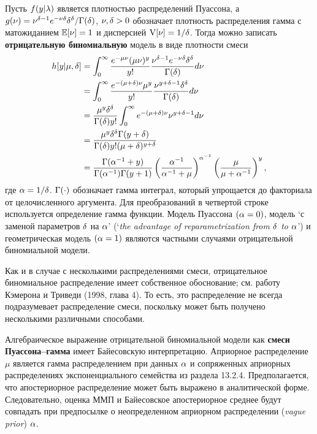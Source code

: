 Пусть $f(y|\lambda)$ является плотностью распределений Пуассона, а $g(\nu) = \nu^{\delta - 1}e^{-\nu\delta}\delta^\delta / \Gamma(\delta)$, $\nu, \delta > 0$ обозначает плотность распределения гамма с матожиданием $\mathbb{E}[\nu] = 1$ и дисперсией $\mathrm{V}[\nu] = 1/\delta$. Тогда можно записать \textbf{отрицательную биномиальную} модель в виде плотности смеси %
    \begin{align}\label{eq:20.12}
    h[y|\mu, \delta]   &= \int^{\infty}_{0} \frac{e^{-\mu\nu}(\mu\nu)^y}{y!} \frac{\nu^{\delta - 1}e^{-\nu\delta}\delta^\delta}{\Gamma(\delta)} d\nu \\
                    &= \int^{\infty}_{0} \frac{e^{-(\mu + \delta)\nu} \mu^y}{y!} \frac{\nu^{y + \delta - 1} \delta^\delta}{\Gamma(\delta)} d\nu \notag \\
                    &= \frac{\mu^y \delta^\delta}{\Gamma(\delta) y!} \int^{\infty}_{0} e^{-(\mu + \delta)\nu} \nu^{y + \delta - 1} d\nu \notag \\
                    &= \frac{\mu^y \delta^\delta \Gamma(y + \delta)}{\Gamma(\delta) y! (\mu + \delta)^{y + \delta}} \notag \\
                    &= \frac{\Gamma(\alpha^{-1} + y)}{\Gamma(\alpha^{-1}) \Gamma(y + 1)} \left( \frac{\alpha^{-1}}{\alpha^{-1} +\mu } \right)^{\alpha^{-1}} \left( \frac{\mu}{\mu + \alpha^{-1}} \right)^{y}, \notag
    \end{align}
где $\alpha = 1/\delta$. $\Gamma(\cdot)$ обозначает гамма интеграл, который упрощается до факториала от целочисленного аргумента. Для преобразований в четвертой строке используется определение гамма функции. Модель Пуассона $(\alpha = 0)$, модель `с заменой параметров $\delta$ на $\alpha$' (`\textit{the advantage of reparametrization from $\delta$ to $\alpha$}') и геометрическая модель $(\alpha = 1)$ являются частными случаями отрицательной биномиальной модели.

Как и в случае с несколькими распределениями смеси, отрицательное биномиальное распределение имеет собственное обоснование; см. работу Кэмерона и Триведи (1998, глава 4). То есть, это распределение не всегда подразумевает распределение смеси, поскольку может быть получено несколькими различными способами.

Алгебраическое выражение отрицательной биномиальной модели как \textbf{смеси Пуассона--гамма} имеет Байесовскую интерпретацию. Априорное распределение $\mu$ является гамма распределением при данных $\alpha$ и сопряженных априорных распределениях  экспоненциального семейства из раздела 13.2.4. Предполагается, что апостериорное распределение может быть выражено в аналитической форме. Следовательно, оценка ММП и Байесовское апостериорное среднее будут совпадать при предпосылке о неопределенном априорном распределении (\textit{vague prior}) $\alpha$.

